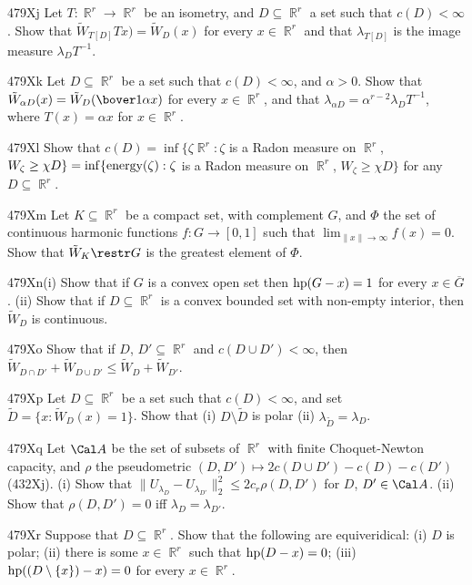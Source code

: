 {\spheader 479Xj Let $T:\BbbR^r\to\BbbR^r$ be an isometry, and
$D\subseteq\BbbR^r$ a set such that $c(D)<\infty$.   Show that
$\tilde W_{T[D]}Tx)=\tilde W_D(x)$ for every $x\in\BbbR^r$ and that
$\lambda_{T[D]}$ is the image measure $\lambda_DT^{-1}$.

\spheader 479Xk Let $D\subseteq\BbbR^r$ be a set such that
$c(D)<\infty$, and $\alpha>0$.   Show that
$\tilde W_{\alpha D}(x)=\tilde W_D(\bover1{\alpha}x)$
for every $x\in\BbbR^r$, and that
$\lambda_{\alpha D}=\alpha^{r-2}\lambda_DT^{-1}$,
where $T(x)=\alpha x$ for $x\in\BbbR^r$.

\spheader 479Xl Show that
$c(D)
=\inf\{\zeta\BbbR^r:\zeta$ is a Radon measure on $\BbbR^r$,
$W_{\zeta}\ge\chi D\}
=\inf\{\mathop{\text{energy}}\nolimits(\zeta):\zeta$ is a Radon measure on $\BbbR^r$,
$W_{\zeta}\ge\chi D\}$
for any $D\subseteq\BbbR^r$.

\spheader 479Xm Let $K\subseteq\BbbR^r$ be a compact set, with complement
$G$, and $\Phi$ the set of
continuous harmonic functions $f:G\to[0,1]$ such that
$\lim_{\|x\|\to\infty}f(x)=0$.   Show that
$\tilde W_K\restr G$ is the greatest element of $\Phi$.

\spheader 479Xn(i) Show that if $G$ is a convex open set then
$\mathop{\text{hp}}\nolimits(G-x)=1$ for every $x\in\overline{G}$.   (ii) Show that if
$D\subseteq\BbbR^r$ is a convex bounded set with non-empty
interior, then $\tilde W_D$ is continuous.

\spheader 479Xo Show that if $D$, $D'\subseteq\BbbR^r$
and $c(D\cup D')<\infty$, then
$\tilde W_{D\cap D'}+\tilde W_{D\cup D'}\le\tilde W_D+\tilde W_{D'}$.

\spheader 479Xp Let $D\subseteq\BbbR^r$ be a set such that
$c(D)<\infty$, and set $\tilde D=\{x:\tilde W_D(x)=1\}$.   Show that
(i) $D\setminus\tilde D$ is polar (ii)
$\lambda_{\tilde D}=\lambda_D$.   

\spheader 479Xq Let $\Cal A$ be the set of subsets of $\BbbR^r$
with finite Choquet-Newton capacity, and
$\rho$ the pseudometric $(D,D')\mapsto 2c(D\cup D')-c(D)-c(D')$ (432Xj).
(i) Show that $\|U_{\lambda_D}-U_{\lambda_{D'}}\|^2_2\le 2c_r\rho(D,D')$
for $D$, $D'\in\Cal A$.
(ii) Show that $\rho(D,D')=0$ iff $\lambda_D=\lambda_{D'}$.

\spheader 479Xr Suppose that $D\subseteq\BbbR^r$.   Show that the
following are equiveridical:  (i) $D$ is polar;  (ii) there is some
$x\in\BbbR^r$ such that $\mathop{\text{hp}}\nolimits(D-x)=0$;  (iii)
$\mathop{\text{hp}}\nolimits((D\setminus\{x\})-x)=0$ for every $x\in\BbbR^r$.

}
